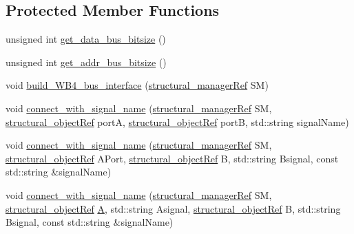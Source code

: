 \subsection*{Protected Member Functions}
\begin{DoxyCompactItemize}
\item 
unsigned int \hyperlink{classWB4__interface_a0ea7f395d607ba25bdb832ee47c0d68c}{get\+\_\+data\+\_\+bus\+\_\+bitsize} ()
\item 
unsigned int \hyperlink{classWB4__interface_abcc03869191ef61861fe936ae8dcd96a}{get\+\_\+addr\+\_\+bus\+\_\+bitsize} ()
\item 
void \hyperlink{classWB4__interface_ae930f536116f54c76c9d948021a79ab9}{build\+\_\+\+W\+B4\+\_\+bus\+\_\+interface} (\hyperlink{structural__manager_8hpp_ab3136f0e785d8535f8d252a7b53db5b5}{structural\+\_\+manager\+Ref} SM)
\item 
void \hyperlink{classWB4__interface_ae026b1e7a0037505afcc162c99dbc4ac}{connect\+\_\+with\+\_\+signal\+\_\+name} (\hyperlink{structural__manager_8hpp_ab3136f0e785d8535f8d252a7b53db5b5}{structural\+\_\+manager\+Ref} SM, \hyperlink{structural__objects_8hpp_a8ea5f8cc50ab8f4c31e2751074ff60b2}{structural\+\_\+object\+Ref} portA, \hyperlink{structural__objects_8hpp_a8ea5f8cc50ab8f4c31e2751074ff60b2}{structural\+\_\+object\+Ref} portB, std\+::string signal\+Name)
\item 
void \hyperlink{classWB4__interface_ac11ca29f65cd4637605343b6e7eb4126}{connect\+\_\+with\+\_\+signal\+\_\+name} (\hyperlink{structural__manager_8hpp_ab3136f0e785d8535f8d252a7b53db5b5}{structural\+\_\+manager\+Ref} SM, \hyperlink{structural__objects_8hpp_a8ea5f8cc50ab8f4c31e2751074ff60b2}{structural\+\_\+object\+Ref} A\+Port, \hyperlink{structural__objects_8hpp_a8ea5f8cc50ab8f4c31e2751074ff60b2}{structural\+\_\+object\+Ref} B, std\+::string Bsignal, const std\+::string \&signal\+Name)
\item 
void \hyperlink{classWB4__interface_a114e79d54311ed8d17711f293fbc73c9}{connect\+\_\+with\+\_\+signal\+\_\+name} (\hyperlink{structural__manager_8hpp_ab3136f0e785d8535f8d252a7b53db5b5}{structural\+\_\+manager\+Ref} SM, \hyperlink{structural__objects_8hpp_a8ea5f8cc50ab8f4c31e2751074ff60b2}{structural\+\_\+object\+Ref} \hyperlink{tutorial__pnnl__2019_2memory_2third_2solution_2mips_8c_a5bbae38a6853eac231d3bb734d82fe8f}{A}, std\+::string Asignal, \hyperlink{structural__objects_8hpp_a8ea5f8cc50ab8f4c31e2751074ff60b2}{structural\+\_\+object\+Ref} B, std\+::string Bsignal, const std\+::string \&signal\+Name)
\item 

\end{DoxyCompactItemize}
